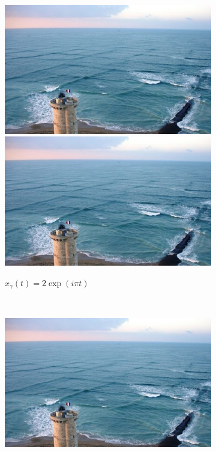 \begin{example}
\begin{figure}
  \begin{subfigure}[b]{0.48\textwidth}
    \includegraphics[draft,width=\textwidth]{images/livekp.jpg}
    \includegraphics[draft,width=\textwidth]{images/livekp.jpg}
    \caption{$x_\gamma(t) = 2\exp(i \pi t)$}
    \label{fig:ancont-c2-circle}
  \end{subfigure}
  ~
  \begin{subfigure}[b]{0.48\textwidth}
    \includegraphics[draft,width=\textwidth]{images/livekp.jpg}

\end{subfigure}
\end{figure}
\end{example}

